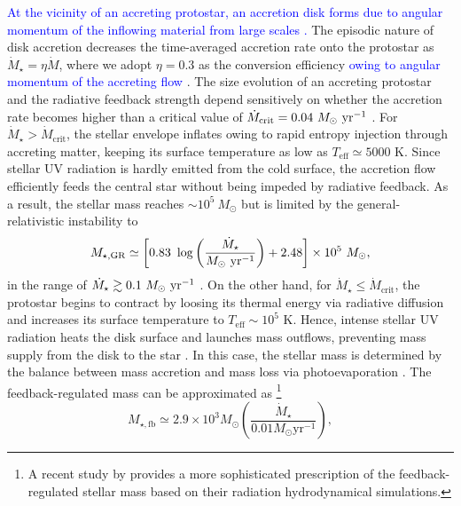 \documentclass[twocolumn, twocolappendix]{aastex63}
\newcommand{\Msun}{M_\odot}
\newcommand{\Msunyr}{M_\odot~{\rm yr}^{-1}}
\newcommand{\Mdot}{\dot{M}}
\newcommand{\blue}[1]{\textcolor{blue}{ #1}}
\begin{document}
\begin{CJK*}{UTF8}{gbsn}
\blue{
At the vicinity of an accreting protostar, an accretion disk forms due to angular momentum of the inflowing material from large scales
\citep{2010MNRAS.403...45S,2011Sci...331.1040C,2011ApJ...737...75G}.}
The episodic nature of disk accretion decreases the time-averaged accretion rate onto the protostar as $\Mdot_{\star}=\eta \Mdot$, 
where we adopt $\eta=0.3$ as the conversion efficiency \blue{owing to angular momentum of the accreting flow} \citep{2016MNRAS.459.1137S, 2022arXiv220614459T}. 
The size evolution of an accreting protostar and the radiative feedback strength depend sensitively on whether
the accretion rate becomes higher than a critical value of $\dot{M}_{\mathrm{crit}}=0.04~\Msunyr$ 
\citep{2001ApJ...561L..55O,2013ApJ...778..178H,2013A&A...558A..59S,2015MNRAS.452..755S,2018MNRAS.474.2757H}.
For $\dot{M}_\star > \Mdot_\mathrm{crit}$, the stellar envelope inflates owing to rapid entropy injection through accreting matter,
keeping its surface temperature as low as $T_\mathrm{eff} \simeq 5000$ K. 
Since stellar UV radiation is hardly emitted from the cold surface, the accretion flow efficiently feeds the central star without being 
impeded by radiative feedback.
As a result, the stellar mass reaches $\sim 10^5~\Msun$ but is limited by the general-relativistic instability to
%
\begin{equation}
 M_{\star, \mathrm{GR}} \simeq\left[0.83~\log \left(\frac{\dot{M}_{\star}}{\Msunyr}\right)+2.48\right] \times 10^{5} ~\Msun,
\end{equation}
%
in the range of $\dot{M}_\star\gtrsim 0.1~\Msunyr$ \citep{2016PhRvD..94b1501S,2017ApJ...842L...6W,2019PASA...36...27W}.
On the other hand, for $\dot{M}_\star \leq \Mdot_\mathrm{crit}$, the protostar begins to contract by loosing its thermal energy via radiative diffusion
and increases its surface temperature to $T_\mathrm{eff} \sim 10^5$ K.
Hence, intense stellar UV radiation heats the disk surface and launches mass outflows, preventing mass supply from the disk to the star
\citep{2008ApJ...681..771M,2011Sci...334.1250H}. 
In this case, the stellar mass is determined by the balance between mass accretion and mass loss via photoevaporation \citep{2013ApJ...773..155T}.
The feedback-regulated mass can be approximated as
\footnote{A recent study by \citet{2022arXiv220614459T} provides a more sophisticated prescription of the feedback-regulated stellar mass based on their radiation hydrodynamical simulations.}
%
\begin{equation}
M_{\star, \mathrm{fb}} \simeq 2.9 \times 10^{3} \Msun\left(\frac{\dot{M}_{\star}}{0.01 M_{\odot} \mathrm{yr}^{-1}}\right),

\end{equation}
\end{CJK*}
\end{document}
